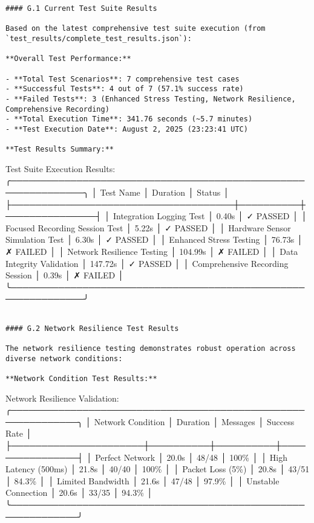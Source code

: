 \documentclass[11pt,a4paper]{article}
\begin{document}
{{\begin{verbatim}
#### G.1 Current Test Suite Results

Based on the latest comprehensive test suite execution (from `test_results/complete_test_results.json`):

**Overall Test Performance:**

- **Total Test Scenarios**: 7 comprehensive test cases
- **Successful Tests**: 4 out of 7 (57.1% success rate)
- **Failed Tests**: 3 (Enhanced Stress Testing, Network Resilience, Comprehensive Recording)
- **Total Execution Time**: 341.76 seconds (~5.7 minutes)
- **Test Execution Date**: August 2, 2025 (23:23:41 UTC)

**Test Results Summary:**

\end{verbatim}
Test Suite Execution Results:
╭──────────────────────────────────────────────────────────────╮
│ Test Name                           │ Duration │ Status        │
├─────────────────────────────────────┼──────────┼───────────────┤
│ Integration Logging Test            │ 0.40s    │ ✓ PASSED     │
│ Focused Recording Session Test      │ 5.22s    │ ✓ PASSED     │
│ Hardware Sensor Simulation Test    │ 6.30s    │ ✓ PASSED     │
│ Enhanced Stress Testing             │ 76.73s   │ ✗ FAILED     │
│ Network Resilience Testing          │ 104.99s  │ ✗ FAILED     │
│ Data Integrity Validation          │ 147.72s  │ ✓ PASSED     │
│ Comprehensive Recording Session     │ 0.39s    │ ✗ FAILED     │
╰──────────────────────────────────────────────────────────────╯
\begin{verbatim}

#### G.2 Network Resilience Test Results

The network resilience testing demonstrates robust operation across diverse network conditions:

**Network Condition Test Results:**

\end{verbatim}
Network Resilience Validation:
╭─────────────────────────────────────────────────────────────╮
│ Network Condition    │ Duration │ Messages │ Success Rate   │
├──────────────────────┼──────────┼──────────┼────────────────┤
│ Perfect Network      │ 20.0s    │ 48/48    │ 100\%          │
│ High Latency (500ms) │ 21.8s    │ 40/40    │ 100\%          │
│ Packet Loss (5\%)     │ 20.8s    │ 43/51    │ 84.3\%         │
│ Limited Bandwidth    │ 21.6s    │ 47/48    │ 97.9\%         │
│ Unstable Connection  │ 20.6s    │ 33/35    │ 94.3\%         │
╰─────────────────────────────────────────────────────────────╯
\begin{verbatim}


\end{verbatim}}}
\end{document}
